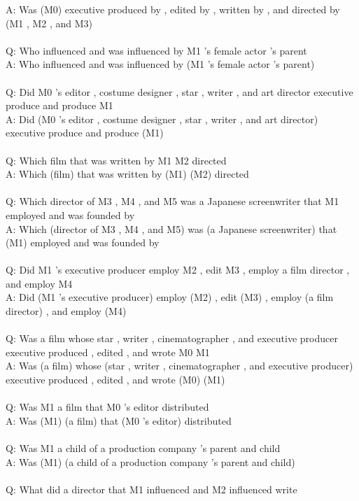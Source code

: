 \documentclass{article} \usepackage{iclr2022_conference,times}
\begin{document}
{A: Was (M0) executive produced by , edited by , written by , and directed by (M1 , M2 , and M3) \\
 \\
Q: Who influenced and was influenced by M1 's female actor 's parent \\
A: Who influenced and was influenced by (M1 's female actor 's parent) \\
 \\
Q: Did M0 's editor , costume designer , star , writer , and art director executive produce and produce M1 \\
A: Did (M0 's editor , costume designer , star , writer , and art director) executive produce and produce (M1) \\
 \\
Q: Which film that was written by M1 M2 directed \\
A: Which (film) that was written by (M1) (M2) directed \\
 \\
Q: Which director of M3 , M4 , and M5 was a Japanese screenwriter that M1 employed and was founded by \\
A: Which (director of M3 , M4 , and M5) was (a Japanese screenwriter) that (M1) employed and was founded by \\
 \\
Q: Did M1 's executive producer employ M2 , edit M3 , employ a film director , and employ M4 \\
A: Did (M1 's executive producer) employ (M2) , edit (M3) , employ (a film director) , and employ (M4) \\
 \\
Q: Was a film whose star , writer , cinematographer , and executive producer executive produced , edited , and wrote M0 M1 \\
A: Was (a film) whose (star , writer , cinematographer , and executive producer) executive produced , edited , and wrote (M0) (M1) \\
 \\
Q: Was M1 a film that M0 's editor distributed \\
A: Was (M1) (a film) that (M0 's editor) distributed \\
 \\
Q: Was M1 a child of a production company 's parent and child \\
A: Was (M1) (a child of a production company 's parent and child) \\
 \\
Q: What did a director that M1 influenced and M2 influenced write \\
}
\end{document}
